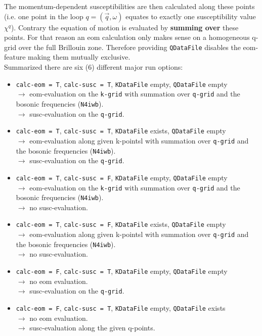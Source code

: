 \documentclass[a4paper,11pt]{article}
\numberwithin{equation}{section} %
\begin{document}
The momentum-dependent susceptibilities are then calculated along these points (i.e. one point in the loop $q=(\vec{q},\omega)$ equates to exactly one susceptibility value $\chi^q$).
Contrary the equation of motion is evaluated by \textbf{summing over} these points.
For that reason an eom calculation only makes sense on a homogeneous q-grid over the full Brillouin zone.
Therefore providing \verb+QDataFile+ disables the eom-feature making them mutually exclusive.
\\[\baselineskip]
Summarized there are six (6) different major run options:
\begin{itemize}
\item {\color{ForestGreen}\verb+calc-eom = T+}, {\color{ForestGreen}\verb+calc-susc = T+}, {\color{red}\verb+KDataFile+ empty}, {\color{red}\verb+QDataFile+ empty}
\\ $\rightarrow$ eom-evaluation on the \verb+k-grid+ with summation over \verb+q-grid+ and the bosonic frequencies (\verb+N4iwb+).
\\ $\rightarrow$ susc-evaluation on the \verb+q-grid+.
\item {\color{ForestGreen}\verb+calc-eom = T+}, {\color{ForestGreen}\verb+calc-susc = T+}, {\color{ForestGreen}\verb+KDataFile+ exists}, {\color{red}\verb+QDataFile+ empty}
\\ $\rightarrow$ eom-evaluation along given k-pointsl with summation over \verb+q-grid+ and the bosonic frequencies (\verb+N4iwb+).
\\ $\rightarrow$ susc-evaluation on the \verb+q-grid+.
\item {\color{ForestGreen}\verb+calc-eom = T+}, {\color{red}\verb+calc-susc = F+}, {\color{red}\verb+KDataFile+ empty}, {\color{red}\verb+QDataFile+ empty}
\\ $\rightarrow$ eom-evaluation on the \verb+k-grid+ with summation over \verb+q-grid+ and the bosonic frequencies (\verb+N4iwb+).
\\ $\rightarrow$ no susc-evaluation.
\item {\color{ForestGreen}\verb+calc-eom = T+}, {\color{red}\verb+calc-susc = F+}, {\color{ForestGreen}\verb+KDataFile+ exists}, {\color{red}\verb+QDataFile+ empty}
\\ $\rightarrow$ eom-evaluation along given k-pointsl with summation over \verb+q-grid+ and the bosonic frequencies (\verb+N4iwb+).
\\ $\rightarrow$ no susc-evaluation.
\item {\color{red}\verb+calc-eom = F+}, {\color{ForestGreen}\verb+calc-susc = T+}, {\color{red}\verb+KDataFile+ empty}, {\color{red}\verb+QDataFile+ empty}
\\ $\rightarrow$ no eom evaluation.
\\ $\rightarrow$ susc-evaluation on the \verb+q-grid+.
\item {\color{red}\verb+calc-eom = F+}, {\color{ForestGreen}\verb+calc-susc = T+}, {\color{red}\verb+KDataFile+ empty}, {\color{ForestGreen}\verb+QDataFile+ exists}
\\ $\rightarrow$ no eom evaluation.
\\ $\rightarrow$ susc-evaluation along the given q-points.
\end{itemize}
\end{document}
